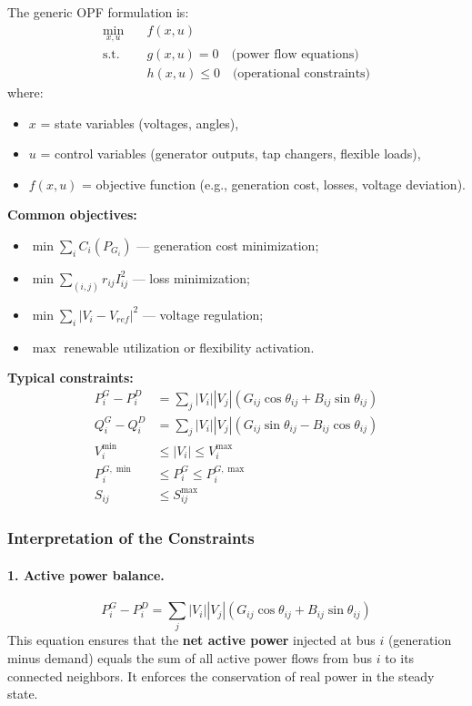 \documentclass[11pt]{article}
\begin{document}
	The generic OPF formulation is:
	\[
	\begin{aligned}
		\min_{x,u} \quad & f(x,u) \\
		\text{s.t.} \quad & g(x,u) = 0 \quad \text{(power flow equations)}\\
		& h(x,u) \le 0 \quad \text{(operational constraints)}
	\end{aligned}
	\]
	where:
	\begin{itemize}
		\item $x$ = state variables (voltages, angles),
		\item $u$ = control variables (generator outputs, tap changers, flexible loads),
		\item $f(x,u)$ = objective function (e.g., generation cost, losses, voltage deviation).
	\end{itemize}
	
	\textbf{Common objectives:}
	\begin{itemize}
		\item $\min \sum_i C_i(P_{G_i})$ — generation cost minimization;
		\item $\min \sum_{(i,j)} r_{ij} I_{ij}^2$ — loss minimization;
		\item $\min \sum_i |V_i - V_{ref}|^2$ — voltage regulation;
		\item $\max$ renewable utilization or flexibility activation.
	\end{itemize}
	
	\textbf{Typical constraints:}
	\begin{align*}
		P_i^{G} - P_i^{D} &= \sum_{j} |V_i||V_j|(G_{ij}\cos\theta_{ij} + B_{ij}\sin\theta_{ij}) \\
		Q_i^{G} - Q_i^{D} &= \sum_{j} |V_i||V_j|(G_{ij}\sin\theta_{ij} - B_{ij}\cos\theta_{ij}) \\
		V_i^{\min} &\le |V_i| \le V_i^{\max} \\
		P_i^{G,\min} &\le P_i^{G} \le P_i^{G,\max} \\
		S_{ij} &\le S_{ij}^{\max}
	\end{align*}
	
	\subsubsection{Interpretation of the Constraints}
	
	\paragraph{1. Active power balance.}
	\[
	P_i^{G} - P_i^{D} = \sum_{j} |V_i||V_j|(G_{ij}\cos\theta_{ij} + B_{ij}\sin\theta_{ij})
	\]
	This equation ensures that the \textbf{net active power} injected at bus $i$ (generation minus demand) equals the sum of all active power flows from bus $i$ to its connected neighbors. It enforces the conservation of real power in the steady state.
	
\end{document}
